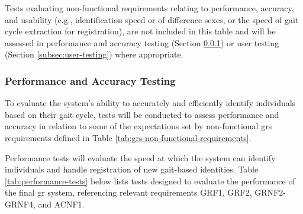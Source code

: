 Tests evaluating non-functional requirements relating to performance, accuracy, and usability (e.g., identification speed or of difference sexes, or the speed of gait cycle extraction for registration), are not included in this table and will be assessed in performance and accuracy testing (Section \ref{subsec:performance-and-accuracy-testing}) or user testing (Section \ref{subsec:user-testing}) where appropriate.

\subsubsection{Performance and Accuracy Testing}
\label{subsec:performance-and-accuracy-testing}

To evaluate the system's ability to accurately and efficiently identify individuals based on their gait cycle, tests will be conducted to assess performance and accuracy in relation to some of the expectations set by non-functional \ac{grs} requirements defined in Table \ref{tab:grs-non-functional-requirements}.

Performance tests will evaluate the speed at which the system can identify individuals and handle registration of new gait-based identities.
Table \ref{tab:performance-tests} below lists tests designed to evaluate the performance of the final \ac{gr} system, referencing relevant requirements GRF1, GRF2, GRNF2-GRNF4, and ACNF1.

